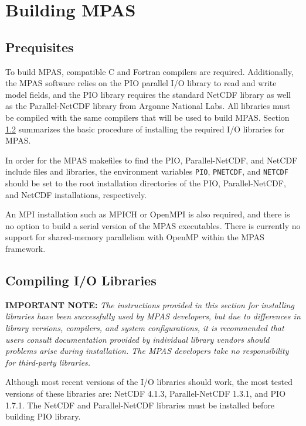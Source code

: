 \chapter{Building MPAS}
\label{chap:mpas_build_instructions}

\section{Prequisites}
\label{build_prerequisites}

To build MPAS, compatible C and Fortran compilers are required. Additionally,
the MPAS software relies on the PIO parallel I/O library to read and write model
fields, and the PIO library requires the standard NetCDF library as well as the
Parallel-NetCDF library from Argonne National Labs. All libraries must be
compiled with the same compilers that will be used to build MPAS. Section
\ref{sec:build_io} summarizes the basic procedure of installing the required I/O
libraries for MPAS.

In order for the MPAS makefiles to find the PIO, Parallel-NetCDF, and NetCDF
include files and libraries, the environment variables {\tt PIO}, {\tt PNETCDF},
and {\tt NETCDF} should be set to the root installation directories of the PIO,
Parallel-NetCDF, and NetCDF installations, respectively. 

An MPI installation such as MPICH or OpenMPI is also required, and there is no
option to build a serial version of the MPAS executables. There is currently no
support for shared-memory parallelism with OpenMP within the MPAS framework.


\section{Compiling I/O Libraries}
\label{sec:build_io}

{\bf IMPORTANT NOTE:} {\em The instructions provided in this section for
installing libraries have been successfully used by MPAS developers, but due to
differences in library versions, compilers, and system configurations, it is
recommended that users consult documentation provided by individual library
vendors should problems arise during installation. The MPAS developers take no
responsibility for third-party libraries.} \vspace{12pt}

Although most recent versions of the I/O libraries should work, the most tested
versions of these libraries are: NetCDF 4.1.3, Parallel-NetCDF 1.3.1, and PIO
1.7.1. The NetCDF and Parallel-NetCDF libraries must be installed before
building PIO library.

